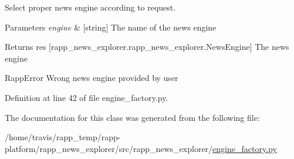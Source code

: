 Select proper news engine according to request. 


\begin{DoxyParams}{Parameters}
{\em engine} & \mbox{[}string\mbox{]} The name of the news engine\\
\hline
\end{DoxyParams}
\begin{DoxyReturn}{Returns}
res \mbox{[}rapp\-\_\-news\-\_\-explorer.\-rapp\-\_\-news\-\_\-explorer.\-News\-Engine\mbox{]} The news engine
\end{DoxyReturn}
Rapp\-Error Wrong news engine provided by user 

Definition at line 42 of file engine\-\_\-factory.\-py.



The documentation for this class was generated from the following file\-:\begin{DoxyCompactItemize}
\item 
/home/travis/rapp\-\_\-temp/rapp-\/platform/rapp\-\_\-news\-\_\-explorer/src/rapp\-\_\-news\-\_\-explorer/\hyperlink{engine__factory_8py}{engine\-\_\-factory.\-py}\end{DoxyCompactItemize}
